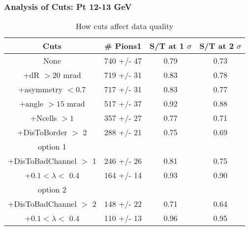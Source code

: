 \frame
{
\frametitle{Analysis of Cuts: Pt 12-13 GeV}
\begin{table}
\caption{How cuts affect data quality}
\centering
\begin{tabular}{c c c c}
\hline\hline
Cuts & \# Pions1 & S/T at 1 $\sigma$ & S/T at 2 $\sigma$ \\ [0.5ex]
\hline
None &  740 +/-   47 & 0.79 & 0.73 \\ %
+dR $> 20$ mrad &  719 +/-   31 & 0.83 & 0.78 \\ %
+asymmetry $< 0.7$ &  717 +/-   31 & 0.83 & 0.77 \\ %
+angle $> 15$ mrad &  517 +/-   37 & 0.92 & 0.88 \\ %
+Ncells $> 1$&  357 +/-   27 & 0.77 & 0.71 \\ %
+DisToBorder $>$ 2 &  288 +/-   21 & 0.75 & 0.69 \\ %
option 1\\
+DisToBadChannel $>$ 1&  246 +/-   26 & 0.81 & 0.75 \\ %
+$0.1 < \lambda <$ 0.4 &  164 +/-   14 & 0.93 & 0.90 \\ %
option 2\\
+DisToBadChannel $>$ 2&  148 +/-   22 & 0.71 & 0.64 \\ %
+$0.1 < \lambda <$ 0.4 &  110 +/-   13 & 0.96 & 0.95 \\ %
[1ex]
\hline
\end{tabular}
\label{table:nonlin}
\end{table}
}
